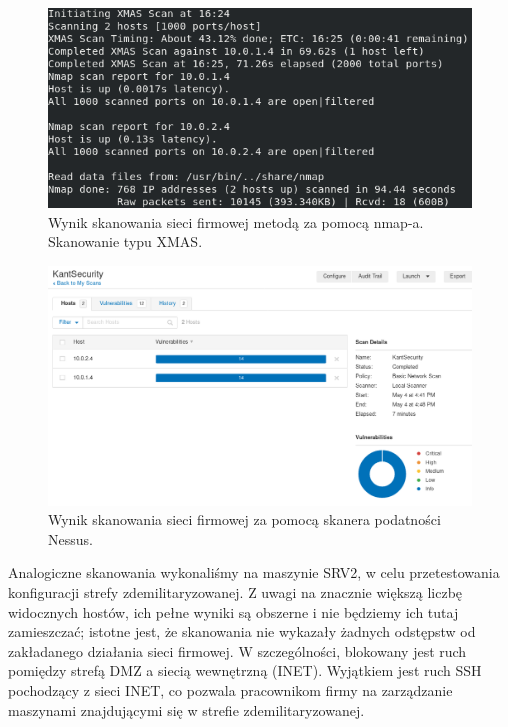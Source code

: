 \documentclass{eiti-raport}
\begin{document}
\begin{figure}[!h] \centering
	\includegraphics[width=0.95\linewidth]{img/nmap-xmas.PNG}
	\caption{Wynik skanowania sieci firmowej metodą za pomocą nmap-a. Skanowanie typu XMAS.} \label{fig:nmap-xmas}
\end{figure}

\begin{figure}[!h] \centering
	\includegraphics[width=0.95\linewidth]{img/nessus.PNG}
	\caption{Wynik skanowania sieci firmowej za pomocą skanera podatności Nessus.} \label{fig:nessus}
\end{figure}

Analogiczne skanowania wykonaliśmy na maszynie SRV2, w celu przetestowania konfiguracji strefy zdemilitaryzowanej. Z uwagi na znacznie większą liczbę widocznych hostów, ich pełne wyniki są obszerne i nie będziemy ich tutaj zamieszczać; istotne jest, że skanowania nie wykazały żadnych odstępstw od zakładanego działania sieci firmowej. W szczególności, blokowany jest ruch pomiędzy strefą DMZ a siecią wewnętrzną (INET). Wyjątkiem jest ruch SSH pochodzący z sieci INET, co pozwala pracownikom firmy na zarządzanie maszynami znajdującymi się w strefie zdemilitaryzowanej.
\end{document}
